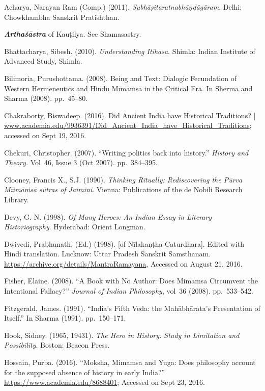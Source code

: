 \begin{thebibliography}{99}
 Acharya, Narayan Ram (Comp.) (2011). \textit{Subhāṣitaratnabhāṇḍāgāram}. Delhi: Chowkhambha Sanskrit Pratishthan.

  \textbf{\textit{Arthaśāstra}} of Kauṭilya. See Shamasastry.

  Bhattacharya, Sibesh. (2010). \textit{Understanding Itihasa}. Shimla: Indian Institute of Advanced Study, Shimla.

  Bilimoria, Purushottama. (2008). Being and Text: Dialogic Fecundation of Western Hermeneutics and Hindu Mīmāṁsā in the Critical Era. In Sherma and Sharma (2008). pp.~45–80.

  Chakraborty, Biswadeep. (2016). Did Ancient India have Historical Traditions? | \url{www.academia.edu/9936391/Did_Ancient_India_have_Historical_Traditions}; accessed on Sept 19, 2016.

  Chekuri, Christopher. (2007). “Writing politics back into history.” \textit{History and Theory.} Vol~46, Issue 3 (Oct 2007). pp.~384–395.

  Clooney, Francis X., S.J. (1990). \textit{Thinking Ritually: Rediscovering the Pūrva Mīimāṁsā sūtras of Jaimini}. Vienna: Publications of the de Nobili Research Library.

  Devy, G. N. (1998). \textit{Of Many Heroes: An Indian Essay in Literary Historiography}. Hyderabad: Orient Longman.

  Dwivedi, Prabhunath. (Ed.) (1998). [of Nīlakaṇṭha Caturdhara]. Edited with Hindi translation. Lucknow: Uttar Pradesh Sanskrit Samsthanam. \url{https://archive.org/details/MantraRamayana}, Accessed on August 21, 2016.

  Fisher, Elaine. (2008). “A Book with No Author: Does Mimamsa Circumvent the Intentional Fallacy?” \textit{Journal of Indian Philosophy}, vol~36 (2008). pp.~533–542.

  Fitzgerald, James. (1991). “India’s Fifth Veda: the Mahābhārata’s Presentation of Itself.” In Sharma (1991). pp.~150–171.

  Hook, Sidney. (1965, 19431). \textit{The Hero in History: Study in Limitation and Possibility}. Boston: Beacon Press.

  Hossain, Purba. (2016). “Moksha, Mimamsa and Yuga: Does philosophy account for the supposed absence of history in early India?” \url{https://www.academia.edu/8688401}; Accessed on Sept 23, 2016.


\end{thebibliography}

